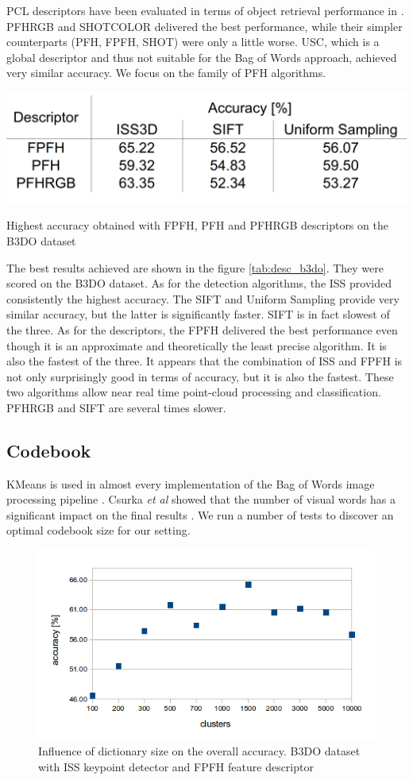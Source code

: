 	PCL descriptors have been evaluated in terms of object retrieval performance in \cite{pcl_features}. PFHRGB and SHOTCOLOR delivered the best performance, while their simpler counterparts (PFH, FPFH, SHOT) were only a little worse. USC, which is a global descriptor and thus not suitable for the Bag of Words approach, achieved very similar accuracy. We focus on the family of PFH algorithms.
	
	\begin{table}[!ht]
	\centering	
	\includegraphics[width=.55\textwidth]{../figs/desc_b3do}
	\caption{Highest accuracy obtained with FPFH, PFH and PFHRGB descriptors on the B3DO dataset}
	\label{tab:desc_b3do}
	\end{table}
	
	The best results achieved are shown in the figure \ref{tab:desc_b3do}. They were scored on the B3DO dataset. As for the detection algorithms, the ISS provided consistently the highest accuracy. The SIFT and Uniform Sampling provide very similar accuracy, but the latter is significantly faster. SIFT is in fact slowest of the three. As for the descriptors, the FPFH delivered the best performance even though it is an approximate and theoretically the least precise algorithm. It is also the fastest of the three. It appears that the combination of ISS and FPFH is not only surprisingly good in terms of accuracy, but it is also the fastest. These two algorithms allow near real time point-cloud processing and classification. PFHRGB and SIFT are several times slower.
		
	\subsection{Codebook}
	KMeans is used in almost every implementation of the Bag of Words image processing pipeline \cite{tsai2012bag, toldo2009bag}. Csurka \emph{et al} showed that the number of visual words has a significant impact on the final results \cite{csurka2004visual}. We run a number of tests to discover an optimal codebook size for our setting.
	
	\begin{figure}[!ht]
	\centering	
	\includegraphics[width=.75\textwidth]{../figs/clustering_centroids_b3do}
	\caption{Influence of dictionary size on the overall accuracy. B3DO dataset with ISS keypoint detector and FPFH feature descriptor}
	\label{fig:cluster_b3do}
	\end{figure}
	
